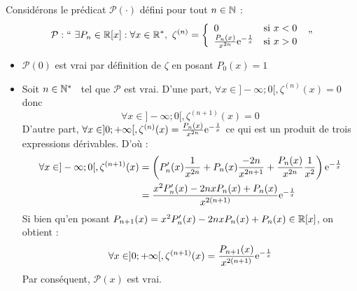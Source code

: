 \documentclass{article}
\begin{document}
\begin{question_kholle}
	Considérons le prédicat $\mathcal{P}(\cdot)$ défini pour tout $n \in \mathbb N$ :
	\begin{equation}
		\mathcal{P} : \text{\textquotedblleft} \ \exists P_n \in \R[x] : \forall x \in \R^*, \ \zeta^{(n)} = \left\{ \begin{array}{lc}
			0                                       & \text{si } x < 0 \\
			\frac{P_n(x)}{x^{2n}} \e^{-\frac{1}{x}} & \text{si } x > 0
		\end{array} \right. \ \text{\textquotedblright}
	\end{equation}
	\begin{itemize}[label=$\star$]
		\item $\mathcal{P}(0)$ est vrai par définition de $\zeta$ en posant $P_0(x) = 1$
		\item Soit $n \in \mathbb N^*$ \fq \ tel que $\mathcal{P}$ est vrai.
		      D'une part, $\forall x \in ]-\infty;0[, \zeta^{(n)}(x) = 0$ donc
		      \begin{equation*}
			      \forall x \in ]-\infty;0[, \zeta^{(n+1)}(x) = 0
		      \end{equation*}
		      D'autre part, $\forall x \in ]0;+\infty[, \zeta^{(n)}(x) = \frac{P_n(x)}{x^{2n}} \mathrm e^{-\frac{1}{x}}$ ce qui est un produit de trois expressions dérivables. D'où :
		      \begin{equation*}
			      \begin{aligned}
				      \forall x \in ]-\infty;0[,
				      \zeta^{(n+1)}(x)
				       & = \left( P_n'(x) \frac{1}{x^{2n}} + P_n(x) \frac{-2n}{x^{2n+1}} + \frac{P_n(x)}{x^{2n}} \frac{1}{x^2} \right) \mathrm e^{-\frac{1}{x}} \\
				       & = \frac{x^2 P_n'(x) - 2nxP_n(x) + P_n(x)}{x^{2(n+1)}} \mathrm e^{-\frac{1}{x}}
			      \end{aligned}
		      \end{equation*}
		      Si bien qu'en posant $P_{n+1}(x) = x^2 P_n'(x) - 2 n x P_n(x) + P_n(x) \in \mathbb R[x]$, on obtient :
		      \begin{equation*}
			      \forall x \in ]0;+\infty[, \zeta^{(n+1)}(x) = \frac{P_{n+1}(x)}{x^{2(n+1)}} \mathrm e^{-\frac{1}{x}}
		      \end{equation*}
		      Par conséquent, $\mathcal{P}(x)$ est vrai.


\end{itemize}
\end{question_kholle}
\end{document}
